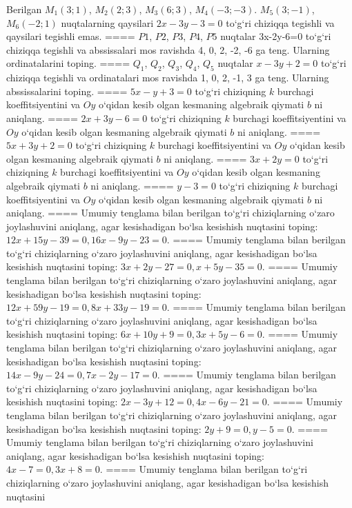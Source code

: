 Berilgan $M_1 (3; 1) $, $M_2 (2; 3) $, $M_3 (6; 3) $,
$M_4 (-3;-3) $. $M_5 (3;-1) $, $M_6 (-2; 1) $ nuqtalarning qaysilari
$2x-3y-3 = 0$ to‘g‘ri chiziqqa tegishli va qaysilari tegishli
emas.
====
$P1$, $P2$, $P3$, $P4$, $P5$ nuqtalar
3x-2y-6=0 to‘g‘ri chiziqqa tegishli va abssissalari mos ravishda
4, 0, 2, -2, -6 ga teng. Ularning ordinatalarini toping.
====
$Q_1$, $Q_2$, $Q_3$, $Q_4$, $Q_5$ nuqtalar
$x-3y+2=0$ to‘g‘ri chiziqqa tegishli va ordinatalari mos ravishda
1, 0, 2, -1, 3 ga teng. Ularning abssissalarini toping.
====
$5x-y+3=0$ to‘g‘ri chiziqning $k$ burchagi
koeffitsiyentini va $Oy$ o‘qidan kesib olgan kesmaning algebraik
qiymati $b$ ni aniqlang.
====
$2x+3y-6=0$ to‘g‘ri chiziqning $k$ burchagi
koeffitsiyentini va $Oy$ o‘qidan kesib olgan kesmaning algebraik
qiymati $b$ ni aniqlang.
====
$5x+3y+2=0$ to‘g‘ri chiziqning $k$ burchagi
koeffitsiyentini va $Oy$ o‘qidan kesib olgan kesmaning algebraik
qiymati $b$ ni aniqlang.
====
$3x+2y=0$ to‘g‘ri chiziqning $k$ burchagi
koeffitsiyentini va $Oy$ o‘qidan kesib olgan kesmaning algebraik
qiymati $b$ ni aniqlang.
====
$y-3=0$ to‘g‘ri chiziqning $k$ burchagi
koeffitsiyentini va $Oy$ o‘qidan kesib olgan kesmaning algebraik
qiymati $b$ ni aniqlang.
====
Umumiy tenglama bilan berilgan to‘g‘ri chiziqlarning
o‘zaro joylashuvini aniqlang, agar kesishadigan bo‘lsa kesishish nuqtasini
toping: $12x+15y-39=0, 16x-9y-23=0$.
====
Umumiy tenglama bilan berilgan to‘g‘ri chiziqlarning
o‘zaro joylashuvini aniqlang, agar kesishadigan bo‘lsa kesishish nuqtasini
toping: $3x+2y-27=0, x+5y-35=0$.
====
Umumiy tenglama bilan berilgan to‘g‘ri chiziqlarning
o‘zaro joylashuvini aniqlang, agar kesishadigan bo‘lsa kesishish nuqtasini
toping: $12x+59y-19=0, 8x+33y-19=0$.
====
Umumiy tenglama bilan berilgan to‘g‘ri chiziqlarning
o‘zaro joylashuvini aniqlang, agar kesishadigan bo‘lsa kesishish nuqtasini
toping: $6x+10y+9=0, 3x+5y-6=0$.
====
Umumiy tenglama bilan berilgan to‘g‘ri chiziqlarning
o‘zaro joylashuvini aniqlang, agar kesishadigan bo‘lsa kesishish nuqtasini
toping: $14x-9y-24=0, 7x-2y-17=0$.
====
Umumiy tenglama bilan berilgan to‘g‘ri chiziqlarning
o‘zaro joylashuvini aniqlang, agar kesishadigan bo‘lsa kesishish nuqtasini
toping: $2x-3y+12=0, 4x-6y-21=0$.
====
Umumiy tenglama bilan berilgan to‘g‘ri chiziqlarning
o‘zaro joylashuvini aniqlang, agar kesishadigan bo‘lsa kesishish nuqtasini
toping: $2y+9=0, y-5=0$.
====
Umumiy tenglama bilan berilgan to‘g‘ri chiziqlarning
o‘zaro joylashuvini aniqlang, agar kesishadigan bo‘lsa kesishish nuqtasini
toping: $4x-7=0, 3x+8=0$.
====
Umumiy tenglama bilan berilgan to‘g‘ri chiziqlarning
o‘zaro joylashuvini aniqlang, agar kesishadigan bo‘lsa kesishish nuqtasini
